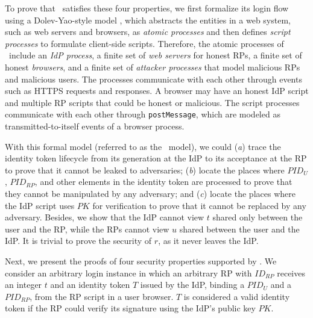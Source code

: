 To prove that \usso~satisfies these four properties, we first formalize its login flow using a Dolev-Yao-style model \cite{SPRESSO}, %
which abstracts the entities in a web system, such as web servers and browsers, as \emph{atomic processes} %
and then defines \emph{script processes} to formulate client-side scripts.
Therefore, the atomic processes of \usso~include an {\em IdP process}, a finite set of {\em web servers} for honest RPs, a finite set of honest {\em browsers}, and a finite set of {\em attacker processes} that model malicious RPs and malicious users. The processes communicate with each other through events such as HTTPS requests and responses. A browser may have an honest IdP script and multiple RP scripts that could be honest or malicious.
The script processes communicate with each other through \verb+postMessage+, which are modeled as transmitted-to-itself events of a browser process.

\newc
With this formal model (referred to as the \dy~model), we could (\emph{a}) trace the identity token lifecycle from its generation at the IdP to its acceptance at the RP to prove that it cannot be leaked to adversaries; (\emph{b}) locate the places where $PID_U$, $PID_{RP}$, and other elements in the identity token are processed to prove that they cannot be manipulated by any adversary; and (\emph{c}) locate the places where the IdP script uses $PK$ for verification to prove that it cannot be replaced by any adversary. Besides, we show that the IdP cannot view $t$ shared only between the user and the RP, while the RPs cannot view $u$ shared between the user and the IdP. It is trivial to prove the security of $r$, as it never leaves the IdP.

Next, we present the proofs of four security properties supported by \usso.
We consider an arbitrary login instance in which an arbitrary RP with $ID_{RP}$ receives an integer $t$ and an identity token $T$ issued by the IdP, binding a $PID_U$ and a $PID_{RP}$, from the RP script in a user browser. $T$ is considered a valid identity token if the RP could verify its signature using the IdP's public key $PK$.


